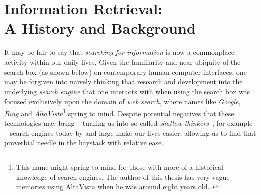 
%

\chapter[Information Retrieval]{Information Retrieval:\\A History and Background}\label{chap:ir_background}
It may be fair to say that \emph{searching for information} is now a commonplace activity within our daily lives. Given the familiarity and near ubiquity of the search box (as shown below) on contemporary human-computer interfaces, one may be forgiven into na\"{i}vely thinking that research and development into the underlying \emph{search engine} that one interacts with when using the search box was focused exclusively upon the domain of \emph{web search}, where names like \emph{Google}, \emph{Bing} and \emph{AltaVista}\footnote{This name might spring to mind for those with more of a historical knowledge of search engines. The author of this thesis has very vague memories using AltaVista when he was around eight years old\dots} spring to mind. Despite potential negatives that these technologies may bring -- turning us into so-called \emph{shallow thinkers}~\citep{carr2008google_stupid}, for example -- search engines today by and large make our lives easier, allowing us to find that proverbial needle in the haystack with relative ease.

\begin{figure}[h]
    \centering
    \vspace{4mm}
    \label{fig:searchbox}
    \vspace{-5mm}
\end{figure}

